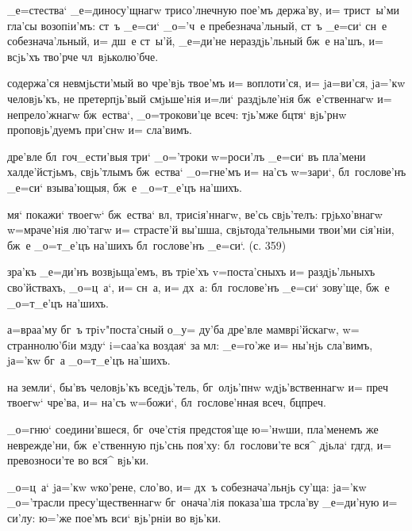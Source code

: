  _е=стества` _е=диносу'щнагw 
трисо'лнечную пое'мъ держа'ву, и= трист~ы'ми гла'сы 
возопiи'мъ: ст~ъ _е=си` _о='ч~е пребезнача'льный, ст~ъ 
_е=си` сн~е собезнача'льный, и= дш~е ст~ы'й, _е=ди'не 
нераздjь'льный бж~е на'шъ, и= всjь'хъ тво'рче 
чл~вjьколю'бче.


   содержа'ся невмjьсти'мый во 
чре'вjь твое'мъ и= воплоти'ся, и= jа=ви'ся, jа='кw 
человjь'къ, не претерпjь'вый смjьше'нiя и=ли` 
раздjьле'нiя бж~е'ственнагw и= непрело'жнагw бж~ества`, 
_о=трокови'це всеч: тjь'мже бц тя` вjь'рнw 
проповjь'дуемъ при'снw и= сла'вимъ.


  дре'вле бл~гоч_ести'выя три` 
_о='троки w=роси'лъ _е=си` въ пла'мени халде'йстjьмъ, 
свjь'тлымъ бж~ества` _о=гне'мъ и= на'съ w=зари`, 
бл~гослове'нъ _е=си` взыва'ющыя, бж~е _о=т_е'цъ на'шихъ.

 мя` покажи` твоегw` бж~ества` вл, 
трисiя'ннагw, ве'сь свjь'телъ: грjьхо'внагw w=мраче'нiя 
лю'тагw и= страсте'й вы'шша, свjьтода'тельными твои'ми 
сiя'нiи, бж~е _о=т_е'цъ на'шихъ бл~гослове'нъ _е=си`. (с. 
359)

 зра'къ _е=ди'нъ возвjьща'емъ, въ трiе'хъ 
v=поста'сныхъ и= раздjь'льныхъ сво'йствахъ, _о=ц~а`, и= 
сн~а, и= дх~а: бл~гослове'нъ _е=си` зову'ще, бж~е 
_о=т_е'цъ на'шихъ.

  а=враа'му бг~ъ трiv"поста'сный 
о_у= ду'ба дре'вле мамврi'йскагw, w= страннолю'бiи мзду` 
i=саа'ка воздая` за мл: _е=го'же и= ны'нjь сла'вимъ, 
jа='кw бг~а _о=т_е'цъ на'шихъ.

   на земли`, бы'въ человjь'къ 
вседjь'тель, бг~олjь'пнw w\т дjь'вственнагw и= преч 
твоегw` чре'ва, и= на'съ w=божи`, бл~гослове'нная 
всеч, бц преч.


  _о=гню` соедини'вшеся, 
бг~оче'стiя предстоя'ще ю='нwши, пла'менемъ же 
неврежде'ни, бж~е'ственную пjь'снь поя'ху: бл~гослови'те 
вся^ дjьла` гд гд, и= превозноси'те во вся^ 
вjь'ки.

 _о=ц~а` jа='кw w\т ко'рене, сло'во, 
и= дх~ъ собезнача'льнjь су'ща: jа='кw _о='трасли 
пресу'щественнагw бг~онача'лiя показа'ша тр сла'ву 
_е=ди'ную и= си'лу: ю='же пое'мъ вси` вjь'рнiи во вjь'ки. 

